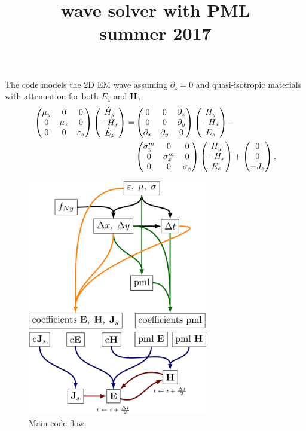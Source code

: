 \documentclass[a4paper,12pt]{article}
\title{wave solver with PML \\ \small{summer 2017}}
\author{}
\date{}
\begin{document}
\maketitle
The code models the 2D EM wave assuming $\partial_z=0$ and quasi-isotropic materials with attenuation for both $E_z$ and ${\bf H}$,
\begin{align}
\begin{pmatrix} 
\mu_y & 0 & 0\cr 
0 & \mu_x & 0 \cr
0 & 0 & \varepsilon_z
\end{pmatrix}
%
\begin{pmatrix} 
\dot{H}_y \cr
-\dot{H}_x \cr
\dot{E}_z
\end{pmatrix}
%
=
%
&
\begin{pmatrix} 
0 & 0 & \partial_x \cr 
0 & 0 & \partial_y \cr
\partial_x & \partial_y & 0
\end{pmatrix}
%
\begin{pmatrix} 
H_y \cr
-H_x \cr
E_z
\end{pmatrix}
%
%
-\\
%
&
%
\begin{pmatrix} 
\sigma^m_y & 0 & 0\cr 
0 & \sigma^m_x & 0 \cr
0 & 0 & \sigma_z
\end{pmatrix}
%
\begin{pmatrix} 
H_y \cr
-H_x \cr
E_z
\end{pmatrix}
%
+
%
\begin{pmatrix} 
0 \cr
0 \cr
-J_z
\end{pmatrix}.
\end{align}
\begin{figure}
\centering
\includegraphics[width=0.7\textwidth]{../pics/tikz/wave-flow.pdf}
\caption{Main code flow.}
\end{figure}
\end{document}
